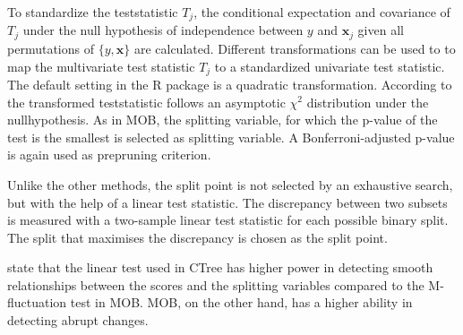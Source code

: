 To standardize the teststatistic $T_{j}$, the conditional expectation and covariance of $T_{j}$ under the null hypothesis of independence between $y$ and $\textbf{x}_j$ given all permutations of $\{y,\textbf{x}\}$ are calculated.
Different transformations can be used to to map the multivariate test statistic $T_{j}$ to a standardized univariate test statistic. The default setting in the R package \citep{.2015c} is a quadratic transformation. According to  \citep{Hothorn.2006} the transformed teststatistic follows an asymptotic $\chi^2$ distribution under the nullhypothesis.
As in MOB, the splitting variable, for which the p-value of the test is the smallest is selected as splitting variable. A Bonferroni-adjusted p-value is again used as prepruning criterion.



Unlike the other methods, the split point is not selected by an exhaustive search, but with the help of a linear test statistic. The discrepancy between two subsets is measured with a two-sample linear test statistic for each possible binary split. The split that maximises the discrepancy is chosen as the split point. \citep{Hothorn.2006}

\citep{Schlosser.2019} state that the linear test used in CTree has higher power in detecting smooth relationships between the scores and the splitting variables compared to the M-fluctuation test in MOB. MOB, on the other hand, has a higher ability in detecting abrupt changes.


